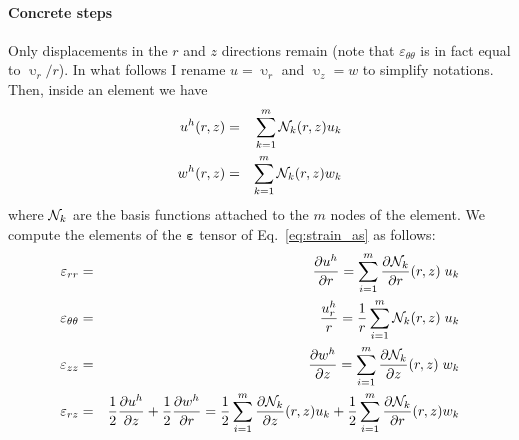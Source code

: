 \paragraph{Concrete steps} Only displacements in the $r$ and $z$ directions remain 
(note that $\varepsilon_{\theta\theta}$ is in fact equal to $\upupsilon_r/r$). In 
what follows I rename $u=\upupsilon_r$ and $\upupsilon_z=w$ to simplify notations. 
Then, inside an element we have 
\begin{eqnarray}
u^h(r,z) &=& \sum_{k=1}^m {\mathcal{N}}_k(r,z) u_k \nonumber\\
w^h(r,z) &=& \sum_{k=1}^m {\mathcal{N}}_k(r,z) w_k
\end{eqnarray}
where ${\mathcal{N}}_k$ are the basis functions attached 
to the $m$ nodes of the element.
We compute the elements of the ${\bm \varepsilon}$ tensor of Eq.~\eqref{eq:strain_as} as follows:
\begin{eqnarray}
\varepsilon_{rr} &=&
\frac{\partial u^h}{\partial r} 
= \sum_{i=1}^m \frac{\partial {\mathcal{N}}_k}{\partial r}(r,z) \; u_k \\
\varepsilon_{\theta\theta} &=& \frac{u_r^h}{r} = 
\frac{1}{r}\sum_{i=1}^m {\mathcal{N}}_k(r,z) \;  u_k \\
\varepsilon_{zz} &=& 
\frac{\partial w^h}{\partial z}
= \sum_{i=1}^m \frac{\partial {\mathcal{N}}_k}{\partial z}(r,z) \; w_k \\
\varepsilon_{rz} &=& \frac12\frac{\partial u^h}{\partial z}
+\frac12 \frac{\partial w^h}{\partial r}
= \frac12\sum_{i=1}^m \frac{\partial {\mathcal{N}}_k}{\partial z}(r,z) u_k
+ \frac12\sum_{i=1}^m \frac{\partial {\mathcal{N}}_k}{\partial r}(r,z) w_k 
\end{eqnarray}

